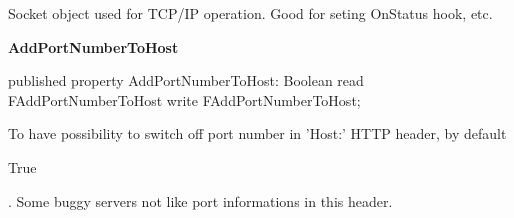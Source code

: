\documentclass{report}
\newif\ifpdf
\begin{document}
\begin{list}{}
\begin{flushleft}
\ifpdf
\end{flushleft}
\fi


\par Socket object used for TCP/IP operation. Good for seting OnStatus hook, etc.\label{httpsend.THTTPSend-AddPortNumberToHost}
\item[\textbf{AddPortNumberToHost}\hfill]
\ifpdf
\begin{flushleft}
\fi
\begin{ttfamily}
published property AddPortNumberToHost: Boolean read FAddPortNumberToHost write FAddPortNumberToHost;\end{ttfamily}

\ifpdf
\end{flushleft}
\fi


\par To have possibility to switch off port number in 'Host:' HTTP header, by default \begin{ttfamily}True\end{ttfamily}. Some buggy servers not like port informations in this header.\end{list}
\end{document}
